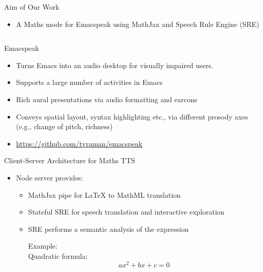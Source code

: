 \documentclass[final,hyperref={pdfpagelabels=false}]{beamer}
\begin{document}
\begin{frame}{}
\begin{columns}[t]
\begin{column}{.48\linewidth}
\begin{block}{\Large Aim of Our Work}
\begin{itemize}
        \item A Maths mode for Emacspeak using MathJax and Speech Rule Engine (SRE)
        \end{itemize}
      \end{block}
    \end{column}
  \end{columns}
  \vfill
  \begin{columns}[t]
    \begin{column}{.32\linewidth}
      \begin{block}{\Large Emacspeak}
        \begin{itemize}
        \item Turns Emacs into an audio desktop for visually impaired users.
        \item Supports a large number of activities in Emacs 
        \item Rich aural presentations via audio formatting and earcons
        \item Conveys spatial layout, syntax highlighting etc., via different
          prosody axes (e.g., change of pitch, richness)
        \item \textcolor{red}{\url{https://github.com/tvraman/emacspeak}}
        \end{itemize}
      \end{block}
      \begin{block}{\Large Client-Server Architecture for Maths TTS}
        \begin{itemize}
        \item Node server provides:
          \begin{itemize}
          \item MathJax pipe for {\LaTeX} to MathML translation
          \item Stateful SRE for speech translation and interactive exploration
          \item SRE performs a semantic analysis of the expression\\
            \begin{minipage}{.3\linewidth}
              Example:\\
              Quadratic formula:\\
              \[ax^2 + bx + c = 0\]
            \end{minipage}
            \begin{minipage}{0.2\linewidth}\tiny
              
            \end{minipage}
            \begin{minipage}{0.45\linewidth}
              

\end{minipage}
\end{itemize}
\end{itemize}
\end{block}
\end{column}
\end{columns}
\end{frame}
\end{document}
